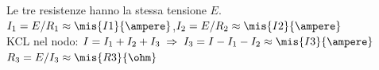 \begin{esercizio}

\begin{solution}
  Le tre resistenze hanno la stessa tensione $E$.\\[2pt]
  $I_1 = E/R_1 \approx \mis{I1}{\ampere}$,\qquad $I_2 = E/R_2 \approx \mis{I2}{\ampere}$\\[4pt]
  KCL nel nodo: $I = I_1 + I_2 + I_3 \;\Rightarrow\; I_3 = I - I_1 - I_2 \approx \mis{I3}{\ampere}$\\[4pt]
  $R_3 = E/I_3 \approx \mis{R3}{\ohm}$
\end{solution}
\end{esercizio}
